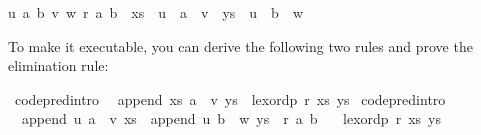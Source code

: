 \begin{isabellebody}
\begin{isamarkuptext}
\begin{isabelle}
u\ a\ b\ v\ w{}\ r\ a\ b\ {}\ {}xs\ {}\ u\ {}\ a\ {}\ v\ {}\ {}ys\ {}\ u\ {}\ b\ {}\ w{}{}%
\end{isabelle}%
\end{isamarkuptext}%
\isamarkuptrue%
%
\endisatagquote
{\isafoldquote}%
%
\isadelimquote
%
\endisadelimquote
%
\begin{isamarkuptext}%
\noindent To make it executable, you can derive the following two
  rules and prove the elimination rule:%
\end{isamarkuptext}%
\isamarkuptrue%
%
\isadelimquote
%
\endisadelimquote
%
\isatagquote
{}\isamarkupfalse%
\ {}code{}pred{}intro{}{}\isanewline
\ \ {}append\ xs\ {}a\ {}\ v{}\ ys\ {}\ lexordp\ r\ xs\ ys{}\isanewline
{}\isamarkupfalse%
\ {}code{}pred{}intro{}{}\isanewline
\ \ {}append\ u\ {}a\ {}\ v{}\ xs\ {}\ append\ u\ {}b\ {}\ w{}\ ys\ {}\ r\ a\ b\isanewline
\ \ {}\ lexordp\ r\ xs\ ys{}\isanewline

\end{isabellebody}
